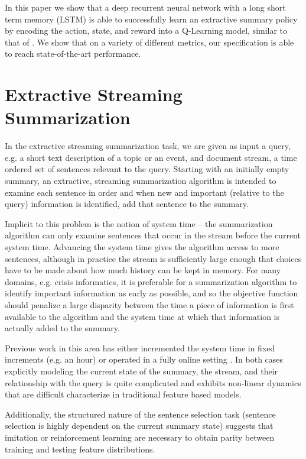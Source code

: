 \documentclass[12pt]{article}
\begin{document}
In this paper we show that a deep recurrent neural network with a long short term memory (LSTM) is able to successfully learn an extractive summary policy by encoding the action, state, and reward into a Q-Learning model, similar to that of  \cite{hausknecht2015deep}. We show that on a variety of different metrics, our specification is able to reach state-of-the-art performance.

\section{Extractive Streaming Summarization}

In the extractive streaming summarization task, we are given as input a query, e.g. a short text description of a topic or an event, and 
document stream, a time ordered set of sentences relevant to the query. Starting with an initially empty summary,  an extractive, streaming summarization algorithm is intended to examine each sentence in order and when new and important (relative to the query) information is identified, add that sentence to the summary. 

Implicit to this problem is the notion of system time -- the summarization algorithm can only examine sentences that occur in the stream before the current system time. Advancing the system time gives the algorithm access to more sentences, although in practice the stream is sufficiently large enough that choices have to be made about how much history can be kept in memory. For many domains, e.g. crisis informatics, it is preferable for a summarization algorithm to identify important information as early as possible, and so the objective function should penalize a large disparity between the time a piece of information is first available to the algorithm and the system time at which that information is actually added to the summary.

Previous work in this area has either incremented the system time in fixed increments (e.g. an hour)  \cite{mccreadie2014incremental,kedzie2015predicting} or operated in
a fully online setting \cite{guo2013updating,kedzie2016real}. In both cases explicitly modeling the current state of the summary, the stream, and their relationship with the query is quite complicated and exhibits non-linear dynamics that are difficult characterize in traditional feature based models.

Additionally, the structured nature of the sentence selection task (sentence selection is highly dependent on the current summary state) suggests that imitation or reinforcement learning are necessary to obtain parity between training and testing feature distributions. 
\end{document}
